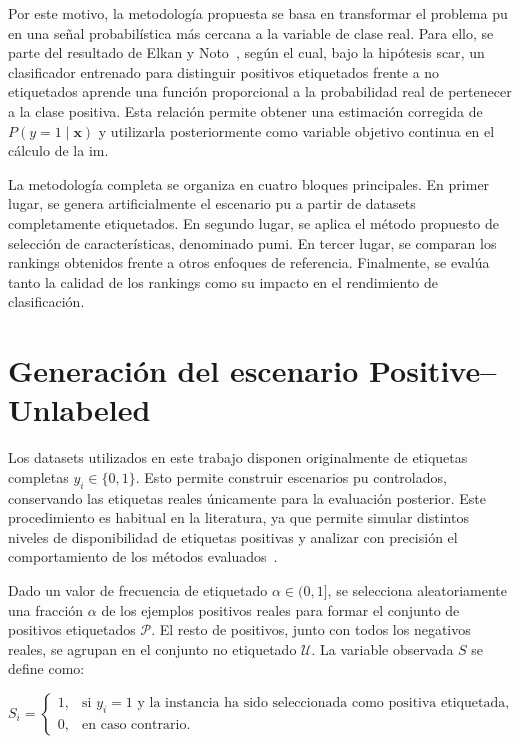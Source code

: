 Por este motivo, la metodología propuesta se basa en transformar el problema \acrshort{pu} en una señal probabilística más cercana a la variable de clase real. Para ello, se parte del resultado de Elkan y Noto~\cite{elkan2008learning}, según el cual, bajo la hipótesis \acrshort{scar}, un clasificador entrenado para distinguir positivos etiquetados frente a no etiquetados aprende una función proporcional a la probabilidad real de pertenecer a la clase positiva. Esta relación permite obtener una estimación corregida de $P(y=1 \mid \mathbf{x})$ y utilizarla posteriormente como variable objetivo continua en el cálculo de la \acrshort{im}.

La metodología completa se organiza en cuatro bloques principales. En primer lugar, se genera artificialmente el escenario \acrshort{pu} a partir de datasets completamente etiquetados. En segundo lugar, se aplica el método propuesto de selección de características, denominado \acrshort{pumi}. En tercer lugar, se comparan los rankings obtenidos frente a otros enfoques de referencia. Finalmente, se evalúa tanto la calidad de los rankings como su impacto en el rendimiento de clasificación.

\section[Generación del escenario]{Generación del escenario Positive--Unlabeled}
\label{sec:generacion_pu}

Los datasets utilizados en este trabajo disponen originalmente de etiquetas completas $y_i \in \{0,1\}$. Esto permite construir escenarios \acrshort{pu} controlados, conservando las etiquetas reales únicamente para la evaluación posterior. Este procedimiento es habitual en la literatura, ya que permite simular distintos niveles de disponibilidad de etiquetas positivas y analizar con precisión el comportamiento de los métodos evaluados~\cite{bekker2020learning}.

Dado un valor de frecuencia de etiquetado $\alpha \in (0,1]$, se selecciona aleatoriamente una fracción $\alpha$ de los ejemplos positivos reales para formar el conjunto de positivos etiquetados $\mathcal{P}$. El resto de positivos, junto con todos los negativos reales, se agrupan en el conjunto no etiquetado $\mathcal{U}$. La variable observada $S$ se define como:

\begin{equation}
S_i =
\begin{cases}
1, & \text{si } y_i = 1 \text{ y la instancia ha sido seleccionada como positiva etiquetada},\\
0, & \text{en caso contrario}.
\end{cases}
\label{eq:generacion_s}
\end{equation}


